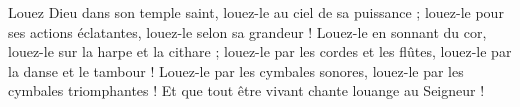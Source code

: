 Louez Dieu dans son temple saint, louez-le au ciel de sa puissance ;
\versseparator
louez-le pour ses actions éclatantes, louez-le selon sa grandeur !
\versseparator
Louez-le en sonnant du cor, louez-le sur la harpe et la cithare ;
\versseparator
louez-le par les cordes et les flûtes, louez-le par la danse et le tambour !
\versseparator
Louez-le par les cymbales sonores, louez-le par les cymbales triomphantes !
\versseparator
Et que tout être vivant chante louange au Seigneur !
